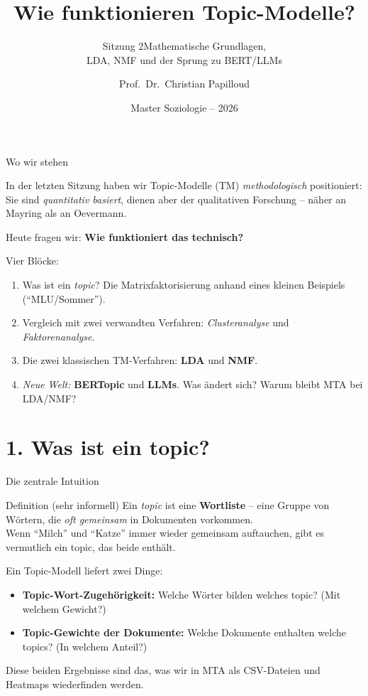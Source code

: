 \documentclass[aspectratio=169,11pt]{beamer}
\title{Wie funktionieren Topic-Modelle?}
\subtitle{Sitzung 2\mdash{}Mathematische Grundlagen,\\LDA, NMF und der Sprung zu BERT/LLMs}
\author{Prof.~Dr.~Christian Papilloud}
\institute{Institut für Soziologie\\Martin-Luther-Universität Halle-Wittenberg}
\date{Master Soziologie – 2026}
\let\oldemph\emph
\renewcommand{\emph}[1]{{\color{solCyan}\oldemph{#1}}}
\let\oldtextbf\textbf
\renewcommand{\textbf}[1]{{\color{solBase3}\oldtextbf{#1}}}
\begin{document}
\begin{frame}[plain]
  \titlepage
\end{frame}

\begin{frame}{Wo wir stehen}

  In der letzten Sitzung haben wir Topic-Modelle (TM) \emph{methodologisch}
  positioniert: Sie sind \emph{quantitativ basiert}, dienen aber der
  qualitativen Forschung – näher an Mayring als an Oevermann.

  \vfill
  Heute fragen wir: \textbf{Wie funktioniert das technisch?}

  \vfill
  Vier Blöcke:
  \begin{enumerate}
    \item[\textbf{1.}] Was ist ein \emph{topic}? Die Matrixfaktorisierung
          anhand eines kleinen Beispiels (\enquote{MLU/Sommer}).
    \item[\textbf{2.}] Vergleich mit zwei verwandten Verfahren:
          \emph{Clusteranalyse} und \emph{Faktorenanalyse}.
    \item[\textbf{3.}] Die zwei klassischen TM-Verfahren:
          \textbf{LDA} und \textbf{NMF}.
    \item[\textbf{4.}] \emph{Neue Welt:} \textbf{BERTopic} und \textbf{LLMs}.
          Was ändert sich? Warum bleibt MTA bei LDA/NMF?
  \end{enumerate}

\end{frame}

\section{1. Was ist ein topic?}

\begin{frame}{Die zentrale Intuition}

  \begin{block}{Definition (sehr informell)}
    Ein \emph{topic} ist eine \textbf{Wortliste} – eine Gruppe von
    Wörtern, die \emph{oft gemeinsam} in Dokumenten vorkommen.
    \\[4pt]
    Wenn \enquote{Milch} und \enquote{Katze} immer wieder gemeinsam
    auftauchen, gibt es vermutlich ein topic, das beide enthält.
  \end{block}

  \vfill
  Ein Topic-Modell liefert zwei Dinge:
  \begin{itemize}
    \item \textbf{Topic-Wort-Zugehörigkeit:} Welche Wörter bilden welches
          topic? (Mit welchem Gewicht?)
    \vfill
    \item \textbf{Topic-Gewichte der Dokumente:} Welche Dokumente
          enthalten welche topics? (In welchem Anteil?)
  \end{itemize}

  \vfill
  Diese beiden Ergebnisse sind das, was wir in MTA als CSV-Dateien
  und Heatmaps wiederfinden werden.

\end{frame}
\end{document}
